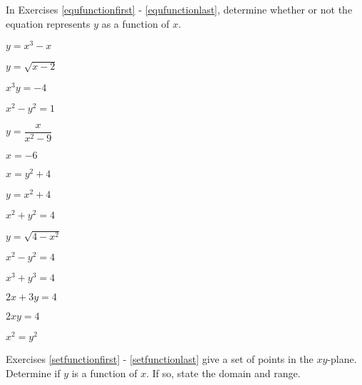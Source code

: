 In Exercises \ref{equfunctionfirst} - \ref{equfunctionlast}, determine whether or not the equation represents $y$ as a function of $x$.  

\begin{shortexenum}
\item $y = x^{3} - x$ \label{equfunctionfirst}
\item $y = \sqrt{x - 2}$
\item $x^{3}y = -4$ 
\item $x^{2} - y^{2} = 1$
\item $y = \dfrac{x}{x^{2} - 9}$
\item $x = -6$
\item  $x = y^2 + 4$
\item $y = x^2 + 4$
\item $x^2 + y^2 = 4$
\item $y = \sqrt{4-x^2}$
\item $x^2 - y^2 = 4$
\item $x^3 + y^3 = 4$
\item $2x + 3y = 4$
\item $2xy = 4$
\item $x^2 = y^2$ \label{equfunctionlast}
\end{shortexenum}

Exercises \ref{setfunctionfirst} - \ref{setfunctionlast} give a set of points in the $xy$-plane.    Determine if $y$ is a function of $x$.  If so, state the domain and range.

